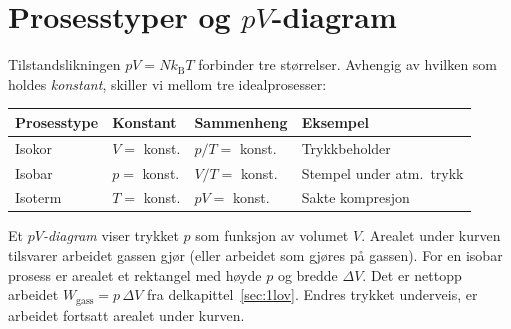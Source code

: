 




\section{Prosesstyper og $pV$-diagram}
\label{sec:prosesser}

Tilstandslikningen $pV = Nk_\text{B}T$ forbinder tre størrelser.
Avhengig av hvilken som holdes \emph{konstant}, skiller vi mellom tre idealprosesser:

\begin{tcolorbox}[colback=gray!13, colframe=gray!40, boxrule=0.5pt,
    arc=2pt, left=6pt, right=6pt, top=4pt, bottom=4pt]
\begin{tabular}{llll}
  \textbf{Prosesstype} & \textbf{Konstant} & \textbf{Sammenheng} & \textbf{Eksempel} \\
  \hline
  Isokor  & $V = $ konst. & $p/T = $ konst. & Trykkbeholder \\
  Isobar   & $p = $ konst. & $V/T = $ konst. & Stempel under atm.\ trykk \\
  Isoterm & $T = $ konst. & $pV = $ konst.  & Sakte kompresjon \\
\end{tabular}
\end{tcolorbox}

Et \emph{$pV$-diagram} viser trykket $p$ som funksjon av volumet $V$.
Arealet under kurven tilsvarer arbeidet gassen gjør (eller arbeidet som gjøres på gassen).
For en isobar prosess er arealet et rektangel med høyde $p$ og bredde $\Delta V$. Det er nettopp arbeidet $W_\text{gass} = p\,\Delta V$ fra delkapittel~\ref{sec:1lov}. Endres trykket underveis, er arbeidet fortsatt arealet under kurven.

